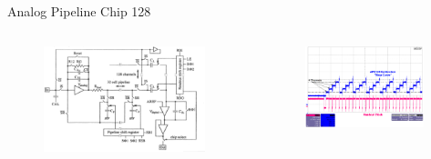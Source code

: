\documentclass{beamer}
\begin{document}
\begin{frame}{Analog Pipeline Chip 128}
  \centering
  \begin{columns}
      \begin{figure}
        \includegraphics[width=0.95\textwidth]{figures/APC128_Schematic}
      \end{figure}
      \begin{figure}
        \includegraphics[width=0.95\textwidth]{figures/APC_Readout}
      \end{figure}
  \end{columns}
\end{frame}
\end{document}
